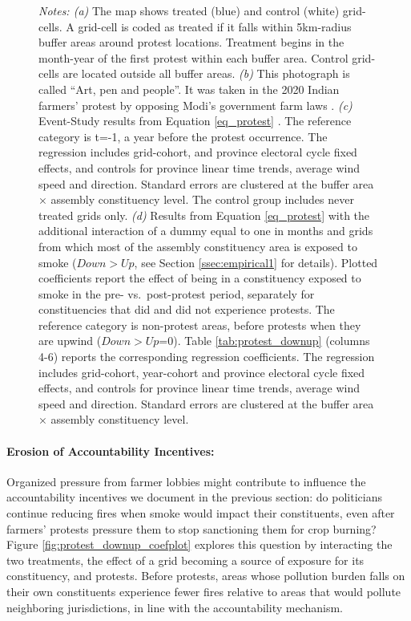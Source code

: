\documentclass[12pt]{article}
\begin{document}
\begin{figure}[hbtp!]
    
    \begin{minipage}{\textwidth}
        {\small \textit{Notes: (a)} The map shows treated (blue) and control (white) grid-cells. A grid-cell is coded as treated if it falls within 5km-radius buffer areas around protest locations. Treatment begins in the month-year of the first protest within each buffer area. Control grid-cells are located outside all buffer areas.
         \textit{(b)} This photograph is called ``Art, pen and people''. It was taken in the 2020 Indian farmers' protest by opposing Modi's government farm laws \citep{maddoke2020art}.
         \textit{(c)} Event-Study results from Equation \ref{eq_protest} %
         . The reference category is t=-1, a year before the protest occurrence. 
        The regression includes grid-cohort, and province electoral cycle fixed effects, and controls for province linear time trends, average wind speed and direction. Standard errors are clustered at the buffer area $\times$ assembly constituency level. The control group includes never treated grids only. 
        \textit{(d)} 
        Results from Equation \ref{eq_protest} with the additional interaction of a dummy equal to one in months and grids from which most of the assembly constituency area is exposed to smoke ($Down>Up$, see Section \ref{ssec:empirical1} for details).
        Plotted coefficients report the effect of being in a constituency exposed to smoke in the pre- vs.\ post-protest period, separately for constituencies that did and did not experience protests. The reference category is non-protest areas, before protests when they are upwind ($Down>Up$=0). 
        Table \ref{tab:protest_downup} (columns 4-6) reports the corresponding regression coefficients.
        The regression includes grid-cohort, year-cohort and province electoral cycle fixed effects, and controls for province linear time trends, average wind speed and direction. Standard errors are clustered at the buffer area $\times$ assembly constituency level.}
    \end{minipage}
\end{figure}






\paragraph{Erosion of Accountability Incentives:}
Organized pressure from farmer lobbies might contribute to influence the accountability incentives we document in the previous section: do politicians continue reducing fires when smoke would impact their constituents, even after farmers' protests pressure them to stop sanctioning them for crop burning? Figure \ref{fig:protest_downup_coefplot} explores this question by interacting the two treatments, the effect of a grid becoming a source of exposure for its constituency, and protests. Before protests, areas whose pollution burden falls on their own constituents experience fewer fires relative to areas that would pollute neighboring jurisdictions, in line with the accountability mechanism. 
\end{document}
